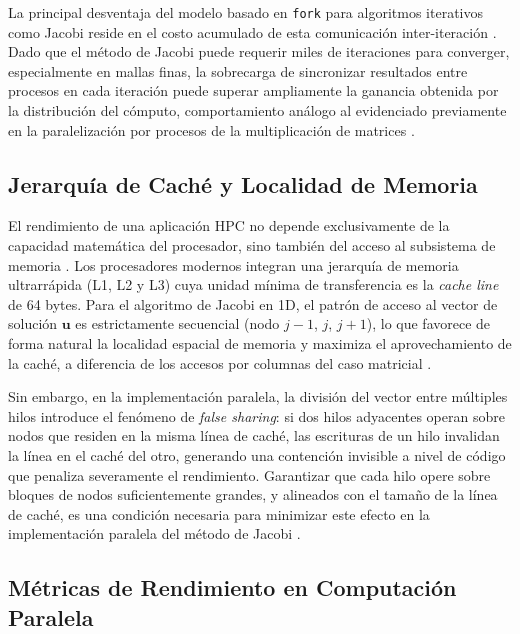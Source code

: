 La principal desventaja del modelo basado en \texttt{fork} para algoritmos iterativos
como Jacobi reside en el costo acumulado de esta comunicación inter-iteración
\parencite{silberschatz2018os}. Dado que el método de Jacobi puede requerir miles de
iteraciones para converger, especialmente en mallas finas, la sobrecarga de
sincronizar resultados entre procesos en cada iteración puede superar ampliamente la
ganancia obtenida por la distribución del cómputo, comportamiento análogo al evidenciado
previamente en la paralelización por procesos de la multiplicación de matrices
\parencite{hager2010hpc}.

\subsection{Jerarquía de Caché y Localidad de Memoria}

El rendimiento de una aplicación HPC no depende exclusivamente de la capacidad matemática
del procesador, sino también del acceso al subsistema de memoria \parencite{drepper2007memory}.
Los procesadores modernos integran una jerarquía de memoria ultrarrápida (L1, L2 y L3)
cuya unidad mínima de transferencia es la \textit{cache line} de 64 bytes. Para el algoritmo de Jacobi en 1D, el patrón de acceso al
vector de solución $\mathbf{u}$ es estrictamente secuencial (nodo $j-1$, $j$, $j+1$),
lo que favorece de forma natural la localidad espacial de memoria y maximiza el
aprovechamiento de la caché, a diferencia de los accesos por columnas del caso matricial
\parencite{patterson2017computer}.

Sin embargo, en la implementación paralela, la división del vector entre múltiples hilos
introduce el fenómeno de \textit{false sharing}: si dos hilos adyacentes operan sobre
nodos que residen en la misma línea de caché, las escrituras de un hilo invalidan la
línea en el caché del otro, generando una contención invisible a nivel de código que
penaliza severamente el rendimiento. Garantizar que cada hilo
opere sobre bloques de nodos suficientemente grandes, y alineados con el tamaño de la
línea de caché, es una condición necesaria para minimizar este efecto en la
implementación paralela del método de Jacobi \parencite{drepper2007memory}.

\subsection{Métricas de Rendimiento en Computación Paralela}

